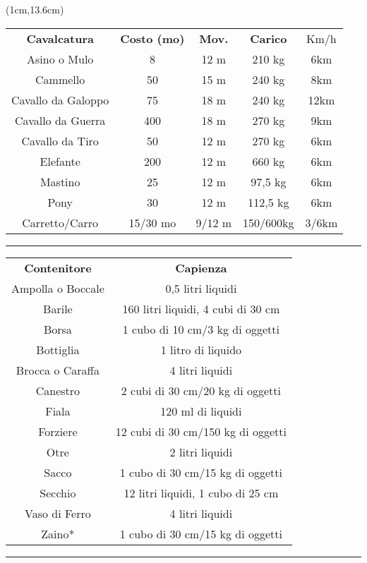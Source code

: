 \documentclass[a4paper,12 pt,openany]{book}
\newcommand{\riga}{\rule{\textwidth}{0.4pt}}
\begin{document}
\begin{textblock*}{12cm}(1cm,13.6cm) %

\begin{tabular}{ccccc}
\hline
\textbf{Cavalcatura}&\textbf{Costo (mo)}&\textbf{Mov.}&\textbf{Carico}&Km/h\\
Asino o Mulo&8&12 m&210 kg&6km\\
Cammello&50&15 m&240 kg&8km\\
Cavallo da Galoppo&75&18 m&240 kg&12km\\
Cavallo da Guerra&400&18 m&270 kg&9km\\
Cavallo da Tiro&50&12 m&270 kg&6km\\
Elefante&200&12 m&660 kg&6km\\
Mastino&25&12 m&97,5 kg&6km\\
Pony&30&12 m&112,5 kg&6km\\
Carretto/Carro    & 15/30 mo & 9/12 m   &150/600kg    & 3/6km              \\
\end{tabular}

\riga

\begin{tabular}{cc}

\textbf{Contenitore}&\textbf{Capienza}\\
Ampolla o Boccale&0,5 litri liquidi\\
Barile&			160 litri liquidi, 4 cubi di 30 cm\\
Borsa&			1 cubo di 10 cm/3 kg di oggetti\\
Bottiglia&		1 litro di liquido\\
Brocca o Caraffa&4 litri liquidi\\
Canestro&		2 cubi di 30 cm/20 kg di oggetti\\
Fiala&			120 ml di liquidi\\
Forziere&		12 cubi di 30 cm/150 kg di oggetti\\
Otre&			2 litri liquidi\\
Sacco&			1 cubo di 30 cm/15 kg di oggetti\\
Secchio&		12 litri liquidi, 1 cubo di 25 cm\\
Vaso di Ferro&	4 litri liquidi\\
Zaino*&			1 cubo di 30 cm/15 kg di oggetti\\
\end{tabular}


\riga



\end{textblock*}
\end{document}
